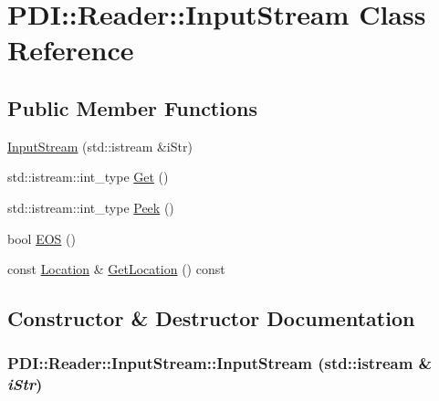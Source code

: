 \hypertarget{class_p_d_i_1_1_reader_1_1_input_stream}{
\section{PDI::Reader::InputStream Class Reference}
\label{class_p_d_i_1_1_reader_1_1_input_stream}
}
\subsection*{Public Member Functions}
\begin{CompactItemize}
\item 
\hyperlink{class_p_d_i_1_1_reader_1_1_input_stream_126ab68f9cb5c880b655dffb42186bce}{InputStream} (std::istream \&iStr)
\item 
std::istream::int\_\-type \hyperlink{class_p_d_i_1_1_reader_1_1_input_stream_4307268a3956a0d43430d91fd85a188b}{Get} ()
\item 
std::istream::int\_\-type \hyperlink{class_p_d_i_1_1_reader_1_1_input_stream_226c12eeb246955dd9335434a344d073}{Peek} ()
\item 
bool \hyperlink{class_p_d_i_1_1_reader_1_1_input_stream_4f01b76d52ea6bfdc320aa353237d484}{EOS} ()
\item 
const \hyperlink{struct_p_d_i_1_1_reader_1_1_location}{Location} \& \hyperlink{class_p_d_i_1_1_reader_1_1_input_stream_c13f1e12d498fa1d2a12d22da984975a}{GetLocation} () const 
\end{CompactItemize}


\subsection{Constructor \& Destructor Documentation}
\hypertarget{class_p_d_i_1_1_reader_1_1_input_stream_126ab68f9cb5c880b655dffb42186bce}{
\subsubsection[{InputStream}]{\setlength{\rightskip}{0pt plus 5cm}PDI::Reader::InputStream::InputStream (std::istream \& {\em iStr})}}
\label{class_p_d_i_1_1_reader_1_1_input_stream_126ab68f9cb5c880b655dffb42186bce}





